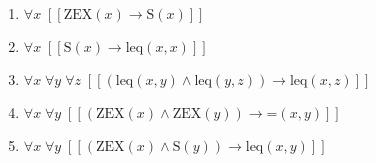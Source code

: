 \documentclass{article}
\begin{document}
\begin{enumerate}
\item $\forall x\;  \left[ \left[ \textrm{ZEX}(x) \rightarrow \textrm{S}(x) \right] \right]$
\item $\forall x\;  \left[ \left[ \textrm{S}(x) \rightarrow \textrm{leq}(x,x) \right] \right]$
\item $\forall x\; \forall y\; \forall z\;  \left[ \left[ \left(\textrm{leq}(x,y) \land \textrm{leq}(y,z)\right) \rightarrow \textrm{leq}(x,z) \right] \right]$
\item $\forall x\; \forall y\;  \left[ \left[ \left(\textrm{ZEX}(x) \land \textrm{ZEX}(y)\right) \rightarrow \textrm{=}(x,y) \right] \right]$
\item $\forall x\; \forall y\;  \left[ \left[ \left(\textrm{ZEX}(x) \land \textrm{S}(y)\right) \rightarrow \textrm{leq}(x,y) \right] \right]$
\end{enumerate}
\end{document}
